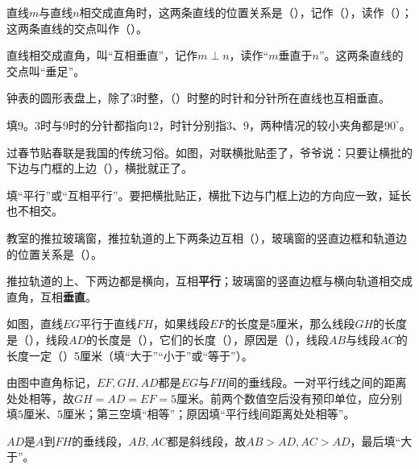 直线\(m\)与直线\(n\)相交成直角时，这两条直线的位置关系是（\hspace{1.8em}），记作（\hspace{1.8em}），读作（\hspace{1.8em}）；这两条直线的交点叫作（\hspace{1.8em}）。\par
\begin{BookAnswer}
直线相交成直角，叫“互相垂直”，记作\(m\perp n\)，读作“\(m\)垂直于\(n\)”。这两条直线的交点叫“垂足”。
\end{BookAnswer}

钟表的圆形表盘上，除了3时整，（\hspace{1.8em}）时整的时针和分针所在直线也互相垂直。\par
\begin{BookAnswer}
填\(9\)。\(3\)时与\(9\)时的分针都指向\(12\)，时针分别指\(3\)、\(9\)，两种情况的较小夹角都是\(90^\circ\)。
\end{BookAnswer}

过春节贴春联是我国的传统习俗。如图，对联横批贴歪了，爷爷说：只要让横批的下边与门框的上边（\hspace{1.8em}），横批就正了。\par
{}
\begin{BookAnswer}
填“平行”或“互相平行”。要把横批贴正，横批下边与门框上边的方向应一致，延长也不相交。
\end{BookAnswer}

教室的推拉玻璃窗，推拉轨道的上下两条边互相（\hspace{1.8em}），玻璃窗的竖直边框和轨道边的位置关系是（\hspace{1.8em}）。\par
\begin{BookAnswer}
推拉轨道的上、下两边都是横向，互相\textbf{平行}；玻璃窗的竖直边框与横向轨道相交成直角，互相\textbf{垂直}。
\end{BookAnswer}

如图，直线\(EG\)平行于直线\(FH\)，如果线段\(EF\)的长度是5厘米，那么线段\(GH\)的长度是（\hspace{1.8em}），线段\(AD\)的长度是（\hspace{1.8em}），它们的长度（\hspace{1.8em}），原因是（\hspace{1.8em}），线段\(AB\)与线段\(AC\)的长度一定（\hspace{1.8em}）5厘米（填“大于”“小于”或“等于”）。\par
{}
\begin{BookAnswer}
由图中直角标记，\allowbreak{}\(EF,GH,AD\)都是\(EG\)与\(FH\)间的垂线段。一对平行线之间的距离处处相等，故\(GH=AD=EF=5\)厘米。前两个数值空后没有预印单位，应分别填\(5\text{厘米}\)、\(5\text{厘米}\)；第三空填“相等”；原因填“平行线间距离处处相等”。\par \(AD\)是\(A\)到\(FH\)的垂线段，\allowbreak{}\(AB,AC\)都是斜线段，故\(AB>AD,AC>AD\)，最后填“大于”。
\end{BookAnswer}

